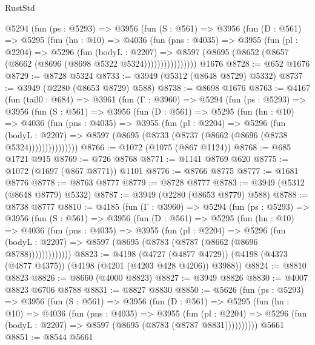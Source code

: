 \begin{lexlean}{RustStd}
\begin{coremodule}
        @5294
          (fun (ps : @5293) =>
          @3956
            (fun (S : @561) =>
            @3956
              (fun (D : @561) =>
              @5295
                (fun (hn : @10) =>
                @4036
                  (fun (pns : @4035) =>
                  @3955
                    (fun (pl : @2204) =>
                    @5296
                      (fun (bodyL : @2207) =>
                      @8597 (@8695 (@8652 (@8657 (@8662 (@8696 (@8698 @5322 @5324))))))))))))))))
    @1676
@8728 := @652 @1676
@8729 := @8728 @5324
@8733 := @3949 (@5312 (@8648 @8729) @5332)
@8737 := @3949 (@2280 (@8653 @8729) @588)
@8738 := @8698 @1676
@8763 := @4167
    (fun (tail0 : @684) =>
    @3961
      (fun (Γ : @3960) =>
      @5294
        (fun (ps : @5293) =>
        @3956
          (fun (S : @561) =>
          @3956
            (fun (D : @561) =>
            @5295
              (fun (hn : @10) =>
              @4036
                (fun (pns : @4035) =>
                @3955
                  (fun (pl : @2204) =>
                  @5296
                    (fun (bodyL : @2207) =>
                    @8597 (@8695 (@8733 (@8737 (@8662 (@8696 (@8738 @5324)))))))))))))))
@8766 := @1072 (@1075 (@867 @1124))
@8768 := @685 @1721 @915
@8769 := @726 @8768
@8771 := @1141 @8769 @620
@8775 := @1072 (@1697 (@867 @8771)) @1101
@8776 := @8766 @8775
@8777 := @1681 @8776
@8778 := @8763 @8777
@8779 := @8728 @8777
@8783 := @3949 (@5312 (@8648 @8779) @5332)
@8787 := @3949 (@2280 (@8653 @8779) @588)
@8788 := @8738 @8777
@8810 := @4185
    (fun (Γ : @3960) =>
    @5294
      (fun (ps : @5293) =>
      @3956
        (fun (S : @561) =>
        @3956
          (fun (D : @561) =>
          @5295
            (fun (hn : @10) =>
            @4036
              (fun (pns : @4035) =>
              @3955
                (fun (pl : @2204) =>
                @5296
                  (fun (bodyL : @2207) =>
                  @8597 (@8695 (@8783 (@8787 (@8662 (@8696 @8788)))))))))))))
@8823 := @4198
    (@4727 (@4877 @4729))
    (@4198 (@4373 (@4877 @4375)) (@4198 (@4201 (@4203 @428 @4206)) @3988))
@8824 := @8810 @8823
@8826 := @8660 (@4000 @8823)
@8827 := @3949 @8826
@8830 := @4007 @8823 @6706 @8788
@8831 := @8827 @8830
@8850 := @5626
    (fun (ps : @5293) =>
    @3956
      (fun (S : @561) =>
      @3956
        (fun (D : @561) =>
        @5295
          (fun (hn : @10) =>
          @4036
            (fun (pns : @4035) =>
            @3955
              (fun (pl : @2204) =>
              @5296 (fun (bodyL : @2207) => @8597 (@8695 (@8783 (@8787 @8831))))))))))
    @5661
@8851 := @8544 @5661

\end{coremodule}
\end{lexlean}
